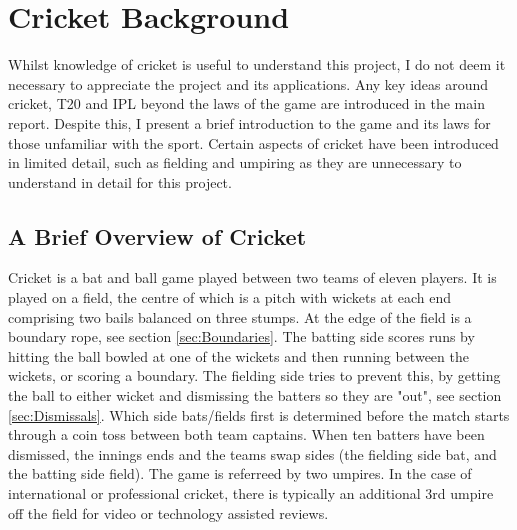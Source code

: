 \documentclass[12pt,a4paper]{report}
\theoremstyle{definition}
\begin{document}



\appendix


\chapter{Cricket Background} \label{chap:CrickBackground}

Whilst knowledge of cricket is useful to understand this project, I do not deem it necessary to appreciate the project and its applications.
Any key ideas around cricket, T20 and IPL beyond the laws of the game are introduced in the main report.
Despite this, I present a brief introduction to the game and its laws for those unfamiliar with the sport.
Certain aspects of cricket have been introduced in limited detail, such as fielding and umpiring as they are unnecessary to understand in detail for this project.

\section{A Brief Overview of Cricket}

Cricket is a bat and ball game played between two teams of eleven players. 
It is played on a field, the centre of which is a pitch with wickets at each end comprising two bails balanced on three stumps. 
At the edge of the field is a boundary rope, see section \ref{sec:Boundaries}. 
The batting side scores runs by hitting the ball bowled at one of the wickets and then running between the wickets, or scoring a boundary.
The fielding side tries to prevent this, by getting the ball to either wicket and dismissing the batters so they are "out", see section \ref{sec:Dismissals}.
Which side bats/fields first is determined before the match starts through a coin toss between both team captains.
When ten batters have been dismissed, the innings ends and the teams swap sides (the fielding side bat, and the batting side field).
The game is referreed by two umpires.
In the case of international or professional cricket, there is typically an additional 3rd umpire off the field for video or technology assisted reviews.
\end{document}
